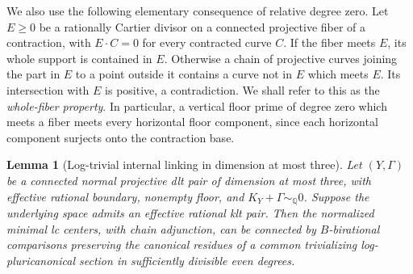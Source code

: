 \documentclass[11pt,letterpaper]{article}
\newcommand{\Q}{\mathbb{Q}}
\newtheorem{lemma}[theorem]{Lemma}
\theoremstyle{definition}
\theoremstyle{remark}
\begin{document}
We also use the following elementary consequence of relative
degree zero.  Let $E\ge0$ be a rationally Cartier divisor on a
connected projective fiber of a contraction, with $E\cdot C=0$
for every contracted curve $C$.  If the fiber meets $E$, its
whole support is contained in $E$.  Otherwise a chain of
projective curves joining the part in $E$ to a point outside
it contains a curve not in $E$ which meets $E$.  Its
intersection with $E$ is positive, a contradiction.  We shall
refer to this as the \emph{whole-fiber property}.  In particular,
a vertical floor prime of degree zero which meets a fiber
meets every horizontal floor component, since each horizontal
component surjects onto the contraction base.

\begin{lemma}[Log-trivial internal linking in dimension at most three]
\label{floor:trivial-linking}
Let $(Y,\Gamma)$ be a connected normal projective dlt pair of
dimension at most three, with effective rational boundary,
nonempty floor, and
$K_Y+\Gamma\sim_\Q0$.  Suppose the underlying space admits
an effective rational klt pair.  Then the normalized minimal
lc centers, with chain adjunction, can be connected by
$B$-birational comparisons preserving the canonical residues
of a common trivializing log-pluricanonical section in
sufficiently divisible even degrees.
\end{lemma}
\end{document}
